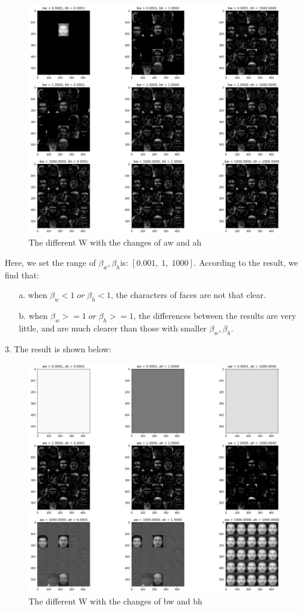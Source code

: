\documentclass[12pt]{article}
\begin{document}
\begin{figure}[H]
\includegraphics[scale=0.5]{p1} 
\caption{The different W with the changes of aw and ah}\label{fig:1} 
\end{figure}
Here, we set the range of $\beta_w, \beta_h$is: $[0.001,\; 1,\; 1000]$. According to the result, we find that: 
\begin{enumerate}
\item[a.]
when $\beta_w<1\;or\; \beta_h<1$, the characters of faces are not that clear.
\item[b.]
when $\beta_w>=1\;or\; \beta_h>=1$, the differences between the results are very little, and are much clearer than those with smaller $\beta_w, \beta_h$.
\end{enumerate}
3. The result is shown below:
\begin{figure}[H]
\includegraphics[scale=0.5]{p2} 
\caption{The different W with the changes of bw and bh}\label{fig:2} 
\end{figure}
\end{document}
